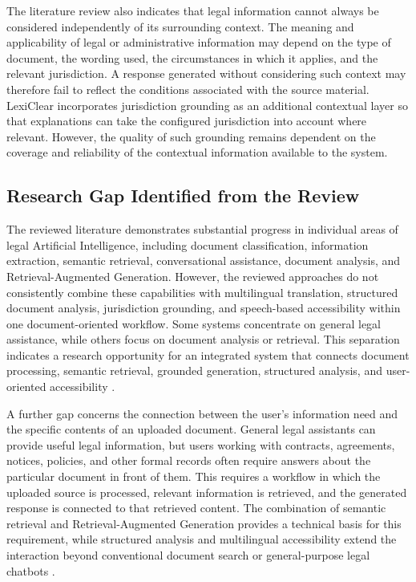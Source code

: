 \documentclass[12pt,a4paper,oneside]{report}
\begin{document}
The literature review also indicates that legal information cannot always be
considered independently of its surrounding context. The meaning and
applicability of legal or administrative information may depend on the type
of document, the wording used, the circumstances in which it applies, and the
relevant jurisdiction. A response generated without considering such
context may therefore fail to reflect the conditions associated with the
source material. LexiClear incorporates jurisdiction grounding as an
additional contextual layer so that explanations can take the configured
jurisdiction into account where relevant. However, the quality of such
grounding remains dependent on the coverage and reliability of the contextual
information available to the system.

\subsection{Research Gap Identified from the Review}

The reviewed literature demonstrates substantial progress in individual areas
of legal Artificial Intelligence, including document classification,
information extraction, semantic retrieval, conversational assistance,
document analysis, and Retrieval-Augmented Generation. However, the reviewed
approaches do not consistently combine these capabilities with multilingual
translation, structured document analysis, jurisdiction grounding, and
speech-based accessibility within one document-oriented workflow. Some
systems concentrate on general legal assistance, while others focus on
document analysis or retrieval. This separation indicates a research
opportunity for an integrated system that connects document processing,
semantic retrieval, grounded generation, structured analysis, and
user-oriented accessibility
\cite{nethriya2024,jurisai2025}.

A further gap concerns the connection between the user's information need and
the specific contents of an uploaded document. General legal assistants can
provide useful legal information, but users working with contracts,
agreements, notices, policies, and other formal records often require answers
about the particular document in front of them. This requires a workflow in
which the uploaded source is processed, relevant information is retrieved,
and the generated response is connected to that retrieved content. The
combination of semantic retrieval and Retrieval-Augmented Generation provides
a technical basis for this requirement, while structured analysis and
multilingual accessibility extend the interaction beyond conventional
document search or general-purpose legal chatbots
\cite{reimers2019sbert,lewis2020rag,jurisai2025}.
\end{document}
